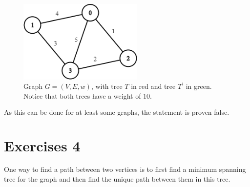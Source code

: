 \documentclass[nobib]{tufte-handout}
\begin{document}
\begin{figure}
    \centering
    \includegraphics[width=0.55\textwidth]{graphics/L6_prim_kruskal_dijkstra/distinctWeights.png}
    \caption{Graph $G = (V,E,w)$, with tree $T$ in red and tree $T^\prime$ in green. Notice that both trees have a weight of 10.}
    \label{fig:distinctWeights}
\end{figure}

As this can be done for at least some graphs, the statement is proven false.
\newpage

\section{Exercises 4}

  One way to find a path between two vertices is to first find a minimum spanning tree for the graph and then find the unique path between them in this tree.  
\end{document}
